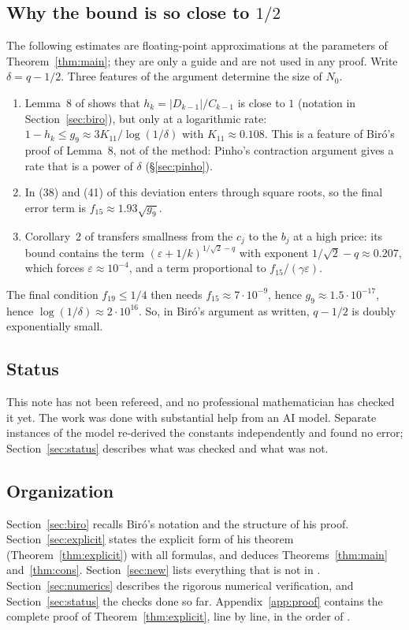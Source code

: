 \documentclass[11pt]{amsart}
\theoremstyle{remark}
\theoremstyle{plain}
\newcommand{\abs}[1]{\lvert #1\rvert}
\newcommand{\eps}{\varepsilon}
\begin{document}
\subsection*{Why the bound is so close to $1/2$}
The following estimates are floating-point approximations at the parameters of Theorem~\ref{thm:main}; they are only a guide and are not used in any proof. Write $\delta=q-1/2$. Three features of the argument determine the size of $N_0$.
\begin{enumerate}[label=(\roman*)]
\item Lemma~8 of \cite{Bir00b} shows that $h_k=\abs{D_{k-1}}/C_{k-1}$ is close to $1$ (notation in Section~\ref{sec:biro}), but only at a logarithmic rate: $1-h_k\le g_9\approx 3K_{11}/\log(1/\delta)$ with $K_{11}\approx0.108$. This is a feature of Bir\'o's proof of Lemma~8, not of the method: Pinho's contraction argument gives a rate that is a power of $\delta$ (\S\ref{sec:pinho}).
\item In (38) and (41) of \cite{Bir00b} this deviation enters through square roots, so the final error term is $f_{15}\approx1.93\sqrt{g_9}$.
\item Corollary~2 of \cite{Bir00b} transfers smallness from the $c_j$ to the $b_j$ at a high price: its bound contains the term $(\eps+1/k)^{1/\sqrt2-q}$ with exponent $1/\sqrt2-q\approx0.207$, which forces $\eps\approx10^{-4}$, and a term proportional to $f_{15}/(\gamma\eps)$.
\end{enumerate}
The final condition $f_{19}\le1/4$ then needs $f_{15}\approx7\cdot10^{-9}$, hence $g_9\approx1.5\cdot10^{-17}$, hence $\log(1/\delta)\approx2\cdot10^{16}$. So, in Bir\'o's argument as written, $q-1/2$ is doubly exponentially small.

\subsection*{Status}
This note has not been refereed, and no professional mathematician has checked it yet. The work was done with substantial help from an AI model. Separate instances of the model re-derived the constants independently and found no error; Section~\ref{sec:status} describes what was checked and what was not.

\subsection*{Organization}
Section~\ref{sec:biro} recalls Bir\'o's notation and the structure of his proof. Section~\ref{sec:explicit} states the explicit form of his theorem (Theorem~\ref{thm:explicit}) with all formulas, and deduces Theorems~\ref{thm:main} and~\ref{thm:cons}. Section~\ref{sec:new} lists everything that is not in \cite{Bir00b}. Section~\ref{sec:numerics} describes the rigorous numerical verification, and Section~\ref{sec:status} the checks done so far. Appendix~\ref{app:proof} contains the complete proof of Theorem~\ref{thm:explicit}, line by line, in the order of \cite{Bir00b}.
\end{document}
